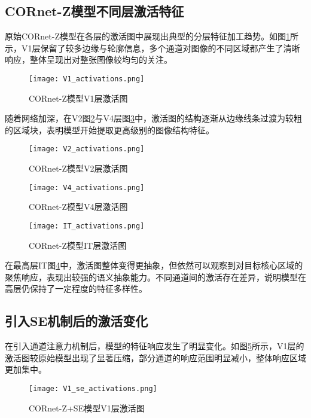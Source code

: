 \subsection{CORnet-Z模型不同层激活特征}

原始CORnet-Z模型在各层的激活图中展现出典型的分层特征加工趋势。如图\ref{f.v1_act}所示，V1层保留了较多边缘与轮廓信息，多个通道对图像的不同区域都产生了清晰响应，整体呈现出对整张图像较均匀的关注。

\begin{figure}[hbt]
	\centering
	\texttt{[image: V1\_activations.png]}
	\caption{CORnet-Z模型V1层激活图}
	\label{f.v1_act}
\end{figure}

随着网络加深，在V2图\ref{f.v2_act}与V4层图\ref{f.v4_act}中，激活图的结构逐渐从边缘线条过渡为较粗的区域块，表明模型开始提取更高级别的图像结构特征。

\begin{figure}[hbt]
	\centering
	\texttt{[image: V2\_activations.png]}
	\caption{CORnet-Z模型V2层激活图}
	\label{f.v2_act}
\end{figure}

\begin{figure}[hbt]
	\centering
	\texttt{[image: V4\_activations.png]}
	\caption{CORnet-Z模型V4层激活图}
	\label{f.v4_act}
\end{figure}

\begin{figure}[hbt]
	\centering
	\texttt{[image: IT\_activations.png]}
	\caption{CORnet-Z模型IT层激活图}
	\label{f.it_act}
\end{figure}

在最高层IT图\ref{f.it_act}中，激活图整体变得更抽象，但依然可以观察到对目标核心区域的聚焦响应，表现出较强的语义抽象能力。不同通道间的激活存在差异，说明模型在高层仍保持了一定程度的特征多样性。

\subsection{引入SE机制后的激活变化}

在引入通道注意力机制后，模型的特征响应发生了明显变化。如图\ref{f.v1_se_act}所示，V1层的激活图较原始模型出现了显著压缩，部分通道的响应范围明显减小，整体响应区域更加集中。

\begin{figure}[hbt]
	\centering
	\texttt{[image: V1\_se\_activations.png]}
	\caption{CORnet-Z+SE模型V1层激活图}
	\label{f.v1_se_act}
\end{figure}

